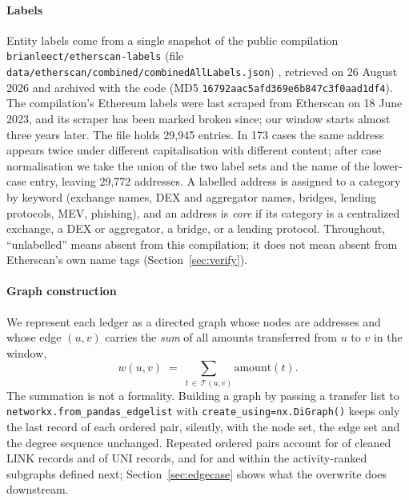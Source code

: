 \paragraph{Labels}
Entity labels come from a single snapshot of the public compilation
\texttt{brianleect/etherscan-labels} (file
\texttt{data/etherscan/combined/combinedAllLabels.json})
\cite{brianleect2023labels}, retrieved on 26 August 2026 and archived with the
code (MD5
\texttt{16792aac5afd369e6b847c3f0aad1df4}). The compilation's Ethereum labels were last scraped from Etherscan on 18 June
2023, and its scraper has been marked broken since; our window starts almost
three years later. The file holds 29{,}945 entries.
In 173 cases the same address appears twice under different capitalisation
with different content; after case normalisation we take the union of the
two label sets and the name of the lower-case entry, leaving 29{,}772
addresses. A labelled address is assigned to a category by keyword
(exchange names, DEX and aggregator names, bridges, lending protocols, MEV,
phishing), and an address is \emph{core} if its category is a centralized
exchange, a DEX or aggregator, a bridge, or a lending protocol. Throughout,
``unlabelled'' means absent from this compilation; it does not mean absent
from Etherscan's own name tags (Section~\ref{sec:verify}).

\paragraph{Graph construction}
We represent each ledger as a directed graph whose nodes are addresses and
whose edge $(u,v)$ carries the \emph{sum} of all amounts transferred from $u$
to $v$ in the window,
\begin{equation}
w(u,v) \;=\; \sum_{t \,\in\, \mathcal{T}(u,v)} \mathrm{amount}(t).
\label{eq:edgeweight}
\end{equation}
The summation is not a formality. Building a graph by passing a transfer list
to \texttt{networkx.from\_pandas\_edgelist} with
\texttt{create\_using=nx.DiGraph()} keeps only the last record of each
ordered pair, silently, with the node set, the edge set and the degree
sequence unchanged. Repeated ordered pairs account for
 of cleaned LINK records and 
of UNI records, and for  and 
within the activity-ranked subgraphs defined next; Section~\ref{sec:edgecase}
shows what the overwrite does downstream.

